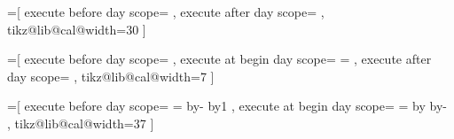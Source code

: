 =[%
  execute before day scope={
  },  
  execute after day scope={
    \pgfmathsetlength{\pgf@x}{\tikz@lib@cal@xshift}
    \pgftransformxshift{-\pgf@x}%
  },
  tikz@lib@cal@width=30%
]



%
%

=[%
  execute before day scope={%
  }, 
  execute at begin day scope={%
    \pgfmathsetlength\pgf@x{\tikz@lib@cal@xshift}%
    \pgf@x=\pgfcalendarcurrentweekday\pgf@x%
    \pgftransformxshift{\pgf@x}%
  },
  execute after day scope={%
  },
  tikz@lib@cal@width=7
]



%
%

=[%
  execute before day scope={%
    {%
      \edef\tikz@lib@cal@month@list@start{\pgfcalendarcurrentweekday}%
    }{}%
    {%
      {%
        \c@pgf@counta=\pgfcalendarcurrentjulian%
        \advance\c@pgf@counta by-\pgfcalendarcurrentday%
        \advance\c@pgf@counta by1\relax%
        \pgfcalendarjuliantoweekday{\c@pgf@counta}{\c@pgf@countb}%
        \xdef\pgf@temp{\the\c@pgf@countb}%
      }%
      \let\tikz@lib@cal@month@list@start=\pgf@temp%
    }{}%
  }, 
  execute at begin day scope={%
    \pgfmathsetlength\pgf@xa{\tikz@lib@cal@xshift}%
    \pgf@xb=\pgfcalendarcurrentday\pgf@xa%
    \advance\pgf@xb by\tikz@lib@cal@month@list@start\pgf@xa%
    \advance\pgf@xb by-\pgf@xa\relax%
    \pgftransformxshift{\pgf@xb}%
  },
  tikz@lib@cal@width=37
]




